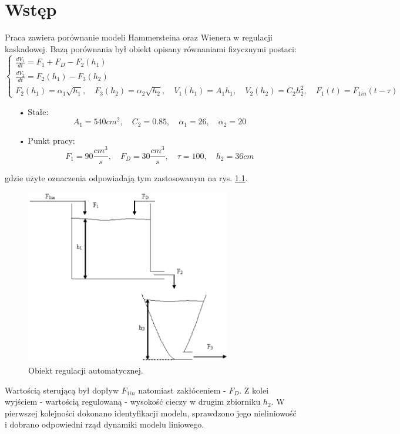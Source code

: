 \chapter{Wstęp}
Praca zawiera porównanie modeli Hammersteina oraz Wienera w regulacji kaskadowej. Bazą porównania był obiekt opisany równaniami fizycznymi postaci:
\begin{equation}
\begin{cases}
\frac{dV_1}{dt} = F_1 + F_D - F_2(h_1) \\
\frac{dV_2}{dt} = F_2(h_1) - F_3(h_2) \\
F_2(h_1) = \alpha_1 \sqrt{h_1}, \quad F_3(h_2) = \alpha_2 \sqrt{h_2}, \quad V_1(h_1) = A_1h_1, \quad V_2(h_2) = C_2h_2^2, \quad F_1(t) = F_{1in}(t-\tau)  
\end{cases}
\label{model_fiz}
\end{equation}

\begin{itemize}
\item[•] Stałe: 
\begin{equation}
A_1 = 540cm^2, \quad C_2 = \num{0.85}, \quad \alpha_1 = 26, \quad \alpha_2 = 20
\end{equation}

\item[•] Punkt pracy:
\begin{equation}
F_1 = 90 \frac{cm^3}{s}, \quad F_D = 30 \frac{cm^3}{s}, \quad \tau = 100, \quad h_2 = 36cm
\end{equation}
\end{itemize}

\noindent gdzie użyte oznaczenia odpowiadają tym zastosowanym na rys. \ref{schemat}.

\begin{figure}[h!]
\centering
\includegraphics[width=0.8\textwidth]{pictures/schemat}
\caption{Obiekt regulacji automatycznej.}
\label{schemat}
\end{figure}

Wartością sterującą był dopływ $F_{1in}$ natomiast zakłóceniem - $F_D$. Z kolei wyjściem - wartością regulowaną - wysokość cieczy w drugim zbiorniku $h_2$. W pierwszej kolejności dokonano identyfikacji modelu, sprawdzono jego nieliniowość i dobrano odpowiedni rząd dynamiki modelu liniowego.